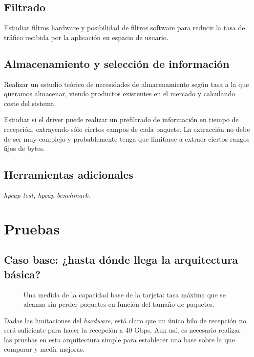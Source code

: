 \documentclass[oneside, draft]{epstfg}
\begin{document}
\section{Filtrado}

Estudiar filtros hardware y posibilidad de filtros software para reducir la tasa de tráfico recibida por la aplicación en espacio de usuario.

\section{Almacenamiento y selección de información}

Realizar un estudio teórico de necesidades de almacenamiento según tasa a la que queramos almacenar, viendo productos existentes en el mercado y calculando coste del sistema.

Estudiar si el driver puede realizar un prefiltrado de información en tiempo de recepción, extrayendo sólo ciertos campos de cada paquete. La extracción no debe de ser muy compleja y probablemente tenga que limitarse a extraer ciertos rangos fijos de bytes.

\section{Herramientas adicionales}

\textit{hpcap-test, hpcap-benchmark}.

\chapter{Pruebas}

\section{Caso base: ¿hasta dónde llega la arquitectura básica?}

\begin{figure}[btp]
\caption[Capacidad de una arquitectura básica de captura]{Una medida de la capacidad base de la tarjeta: tasa máxima que se alcanza sin perder paquetes en función del tamaño de paquetes.}
\label{fig:SimpleArch:MaxRate}
\end{figure}

Dadas las limitaciones del \textit{hardware}, está claro que un único hilo de recepción no será suficiente para hacer la recepción a 40 Gbps. Aun así, es necesario realizar las pruebas en esta arquitectura simple para establecer una base sobre la que comparar y medir mejoras.
\end{document}
